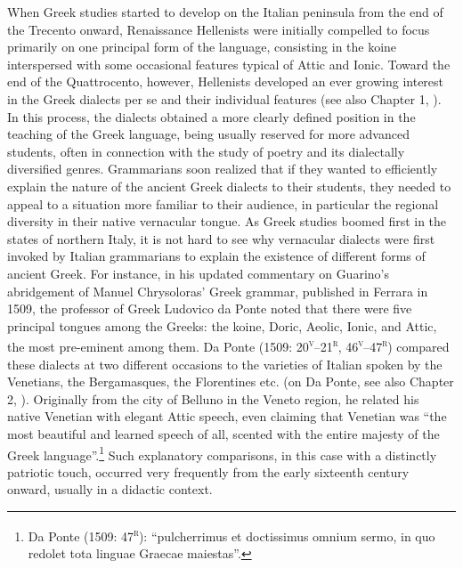 When Greek studies started to develop on the Italian peninsula from the end of the Trecento onward, Renaissance Hellenists were initially compelled to focus primarily on one principal form of the language, consisting in the koine interspersed with some occasional features typical of Attic and Ionic. Toward the end of the Quattrocento, however, Hellenists developed an ever growing interest in the Greek dialects per se and their individual features (see also Chapter 1, ). In this process, the dialects obtained a more clearly defined position in the teaching of the Greek language, being usually reserved for more advanced students, often in connection with the study of poetry and its dialectally diversified genres. Grammarians soon realized that if they wanted to efficiently explain the nature of the ancient Greek dialects to their students, they needed to appeal to a situation more familiar to their audience, in particular the regional diversity in their native vernacular tongue. As Greek studies boomed first in the states of northern Italy, it is not hard to see why vernacular dialects were first invoked by Italian grammarians to explain the existence of different forms of ancient Greek. For instance, in his updated commentary on Guarino’s abridgement of Manuel Chrysoloras’ Greek grammar, published in Ferrara in 1509, the professor of Greek Ludovico da Ponte noted that there were five principal tongues among the Greeks: the koine, Doric, Aeolic, Ionic, and Attic, the most pre-eminent among them. Da Ponte (1509: 20\textsc{\textsuperscript{v}}–21\textsc{\textsuperscript{r}}, 46\textsc{\textsuperscript{v}}–47\textsc{\textsuperscript{r}}) compared these dialects at two different occasions to the varieties of Italian spoken by the Venetians, the Bergamasques, the Florentines etc. (on Da Ponte, see also Chapter 2, ). Originally from the city of Belluno in the Veneto region, he related his native Venetian with elegant Attic speech, even claiming that Venetian was “the most beautiful and learned speech of all, scented with the entire majesty of the Greek language”.\footnote{Da Ponte (1509: 47\textsc{\textsuperscript{r}}): “pulcherrimus et doctissimus omnium sermo, in quo redolet tota linguae Graecae maiestas”.} Such explanatory comparisons, in this case with a distinctly patriotic touch, occurred very frequently from the early sixteenth century onward, usually in a didactic context.

